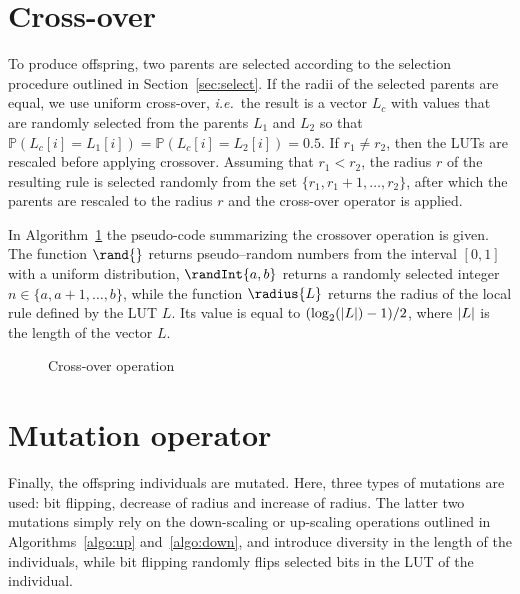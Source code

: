 \section{Cross-over}
To produce offspring, two parents are selected according to the selection  procedure outlined in Section~\ref{sec:select}. If the radii of the selected parents are equal, we use uniform cross-over, \emph{i.e.}\ the result is a vector $L_c$ with values that are randomly selected from the parents $L_1$ and $L_2$ so that $\mathbb{P}(L_c[i] = L_1[i]) = \mathbb{P}(L_c[i] = L_2[i]) = 0.5$. If $r_1\neq r_2$, then the LUTs are rescaled before applying crossover. Assuming that $r_1 < r_2$, the radius $r$ of the resulting rule is selected randomly from the set $\{r_1, r_{1}+1, \dotsc, r_2\}$, after which the parents are rescaled to the radius $r$ and the cross-over operator is applied.

In Algorithm~\ref{algo:cross} the pseudo-code summarizing the crossover operation is given. The function $\rand{}$ returns pseudo--random numbers from the interval $[0,1]$ with a uniform distribution, $\randInt{a,b}$ returns a randomly selected integer $n\in\{a,a+1,\dotsc,b\}$, while the function $\radius{L}$ returns the radius of the local rule defined by the LUT $L$. Its value is equal to $(\log_2(\lvert L\rvert)-1)/2$, where $\lvert L\rvert$ is the length of the vector $L$. 

\begin{figure}
\removelatexerror
\begin{algorithm}[H]
\caption{Cross-over operation}
\label{algo:cross}
\end{algorithm}
\end{figure}

\section{Mutation operator}
Finally, the offspring individuals are mutated. Here, three types of mutations are used: bit flipping, decrease of radius and increase of radius. The latter two mutations simply rely on the down-scaling or up-scaling operations outlined in Algorithms~\ref{algo:up} and~\ref{algo:down}, and introduce diversity in the length of the individuals, while bit flipping randomly flips selected bits in the LUT of the individual.

